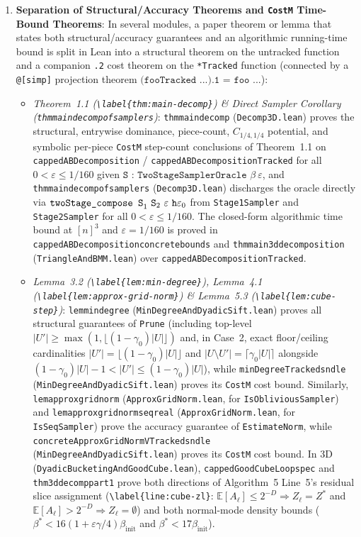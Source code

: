 \documentclass[10pt,letterpaper]{article}
\renewcommand{\_}{\origunderscore\allowbreak}
\newcommand{\code}[1]{\texttt{#1}}
\begin{document}
\begin{enumerate}
  \item \textbf{Separation of Structural/Accuracy Theorems and \code{CostM} Time-Bound Theorems}:
  In several modules, a paper theorem or lemma that states both structural/accuracy guarantees and an algorithmic running-time bound is split in Lean into a structural theorem on the untracked function and a companion \code{.2} cost theorem on the \code{*Tracked} function (connected by a \code{@[simp]} projection theorem $\code{(fooTracked ...).1 = foo ...}$):
  \begin{itemize}
    \item \emph{Theorem~1.1 (\code{\textbackslash label\{thm:main-decomp\}}) \& Direct Sampler Corollary (\code{thm\_main\_decomp\_of\_samplers})}: \code{thm\_main\_decomp} (\code{Decomp3D.lean}) proves the structural, entrywise dominance, piece-count, $C_{1/4,1/4}$ potential, and symbolic per-piece \code{CostM} step-count conclusions of Theorem~1.1 on \code{cappedABDecomposition} / \code{cappedABDecompositionTracked} for all $0 < \varepsilon \le 1/160$ given $\code{S : TwoStageSamplerOracle }\beta\ \varepsilon$, and \code{thm\_main\_decomp\_of\_samplers} (\code{Decomp3D.lean}) discharges the oracle directly via $\code{twoStage\_compose S}_1\ \code{S}_2\ \varepsilon\ \code{h}\varepsilon_0$ from \code{Stage1Sampler} and \code{Stage2Sampler} for all $0 < \varepsilon \le 1/160$. The closed-form algorithmic time bound at $[n]^3$ and $\varepsilon = 1/160$ is proved in \code{cappedABDecomposition\_concrete\_bounds} and \code{thm\_main\_3d\_decomposition} (\code{TriangleAndBMM.lean}) over \code{cappedABDecompositionTracked}.
    \item \emph{Lemma~3.2 (\code{\textbackslash label\{lem:min-degree\}}), Lemma~4.1 (\code{\textbackslash label\{lem:approx-grid-norm\}}) \& Lemma~5.3 (\code{\textbackslash label\{lem:cube-step\}})}: \code{lem\_min\_degree} (\code{MinDegreeAndDyadicSift.lean}) proves all structural guarantees of \code{Prune} (including top-level $|U'| \ge \max(1, \lfloor(1-\gamma_0)|U|\rfloor)$ and, in Case~2, exact floor/ceiling cardinalities $|U'| = \lfloor(1-\gamma_0)|U|\rfloor$ and $|U \setminus U'| = \lceil\gamma_0|U|\rceil$ alongside $(1 - \gamma_0)|U| - 1 < |U'| \le (1 - \gamma_0)|U|$), while \code{minDegreeTracked\_snd\_le} (\code{MinDegreeAndDyadicSift.lean}) proves its \code{CostM} cost bound. Similarly, \code{lem\_approx\_grid\_norm} (\code{ApproxGridNorm.lean}, for \code{IsObliviousSampler}) and \code{lem\_approx\_grid\_norm\_seq\_real} (\code{ApproxGridNorm.lean}, for \code{IsSeqSampler}) prove the accuracy guarantee of \code{EstimateNorm}, while \code{concreteApproxGridNormVTracked\_snd\_le} (\code{MinDegreeAndDyadicSift.lean}) proves its \code{CostM} cost bound. In 3D (\code{DyadicBucketingAndGoodCube.lean}), \code{cappedGoodCubeLoop\_spec} and \code{thm\_3d\_decomp\_part1} prove both directions of Algorithm~5 Line~5's residual slice assignment (\code{\textbackslash label\{line:cube-zl\}}: $\mathbb{E}[A_\ell] \le 2^{-D} \Rightarrow Z_\ell = Z^*$ and $\mathbb{E}[A_\ell] > 2^{-D} \Rightarrow Z_\ell = \emptyset$) and both normal-mode density bounds ($\beta^* < 16(1+\varepsilon\gamma/4)\beta_{\text{init}}$ and $\beta^* < 17\beta_{\text{init}}$).

\end{itemize}
\end{enumerate}
\end{document}

